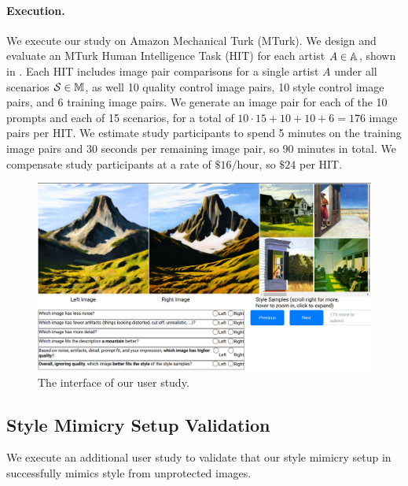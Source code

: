 \documentclass{article}
\newcommand{\method}[0]{\mathcal{S}}
\begin{document}
\paragraph{Execution.} We execute our study on Amazon Mechanical Turk (MTurk). We design and evaluate an MTurk Human Intelligence Task (HIT) for each artist $A \in {\mathbb{A}}$, shown in . Each HIT includes image pair comparisons for a single artist $A$ under all scenarios $\method \in \sM$, as well 10 quality control image pairs, 10 style control image pairs, and 6 training image pairs. We generate an image pair for each of the 10 prompts and each of 15 scenarios, for a total of $10 \cdot 15 + 10 + 10 + 6 = 176$ image pairs per HIT. We estimate study participants to 
spend 5 minutes on the training image pairs and 30 seconds per remaining image pair, so 90 minutes in total. We compensate
study participants at a rate of $\$16 / \text{hour}$, so $\$24$ per HIT.

\begin{figure}
    \centering
    \includegraphics[width=\linewidth]{media/mturk_ui_2.png}
    \caption{The interface of our user study.}
    \label{fig:mturkui}
\end{figure}

\subsection{Style Mimicry Setup Validation}
\label{sec:mimicrysetupvalidation}
We execute an additional user study to validate that our style mimicry setup in  successfully mimics style from
unprotected images.
\end{document}
